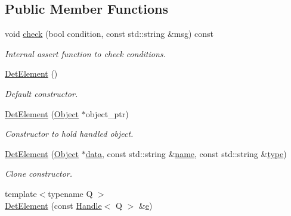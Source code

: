 \subsection*{Public Member Functions}
\begin{DoxyCompactItemize}
\item 
void \hyperlink{class_d_d4hep_1_1_geometry_1_1_det_element_aee32c6df93ab1cb7d6dc36e7ae855112}{check} (bool condition, const std\+::string \&msg) const
\begin{DoxyCompactList}\small\item\em Internal assert function to check conditions. \end{DoxyCompactList}\item 
\hyperlink{class_d_d4hep_1_1_geometry_1_1_det_element_a005be4fc3aa34d82ee55af3f9bb78e47}{Det\+Element} ()
\begin{DoxyCompactList}\small\item\em Default constructor. \end{DoxyCompactList}\item 
\hyperlink{class_d_d4hep_1_1_geometry_1_1_det_element_a8f0fb6554c6b1589e6e44d879735e269}{Det\+Element} (\hyperlink{class_d_d4hep_1_1_geometry_1_1_det_element_a4e44e860d6e5827d9f42a4aea3a4f288}{Object} $\ast$object\+\_\+ptr)
\begin{DoxyCompactList}\small\item\em Constructor to hold handled object. \end{DoxyCompactList}\item 
\hyperlink{class_d_d4hep_1_1_geometry_1_1_det_element_ace96f81c5174b66f986d8c8ccdcab827}{Det\+Element} (\hyperlink{class_d_d4hep_1_1_geometry_1_1_det_element_a4e44e860d6e5827d9f42a4aea3a4f288}{Object} $\ast$\hyperlink{class_d_d4hep_1_1_handle_accccca2cf7cab5a234ab59b8b9e060a2}{data}, const std\+::string \&\hyperlink{class_d_d4hep_1_1_handle_a27c7d467a609ab32c133e1f3c7d85ef5}{name}, const std\+::string \&\hyperlink{class_d_d4hep_1_1_geometry_1_1_det_element_a47782470bbe890c880a2824de6d1b547}{type})
\begin{DoxyCompactList}\small\item\em Clone constructor. \end{DoxyCompactList}\item 
{\footnotesize template$<$typename Q $>$ }\\\hyperlink{class_d_d4hep_1_1_geometry_1_1_det_element_af65fc704c01eced25bf5c79252697d82}{Det\+Element} (const \hyperlink{class_d_d4hep_1_1_handle}{Handle}$<$ Q $>$ \&\hyperlink{_volumes_8cpp_a8a9a1f93e9b09afccaec215310e64142}{e})

\end{DoxyCompactItemize}

